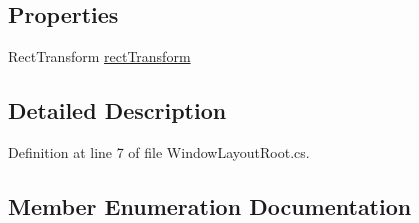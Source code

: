 \subsection*{Properties}
\begin{DoxyCompactItemize}
\item 
Rect\+Transform \hyperlink{class_unity_engine_1_1_u_i_1_1_windows_1_1_window_layout_root_a0d5afb0e19f4235b324ae02f4a66976a}{rect\+Transform}
\end{DoxyCompactItemize}


\subsection{Detailed Description}


Definition at line 7 of file Window\+Layout\+Root.\+cs.



\subsection{Member Enumeration Documentation}
\hypertarget{class_unity_engine_1_1_u_i_1_1_windows_1_1_window_layout_root_a36c316dcd1395b6ae624fef2f948e3d1}{}
